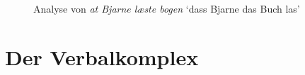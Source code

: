 \begin{enumerate}
\begin{figure}
\caption{\label{fig-at-bjarne-laeste-bogen}Analyse von \emph{at Bjarne læste bogen} `dass Bjarne
  das Buch las'}
\end{figure}



\end{enumerate}


\section{Der Verbalkomplex}

